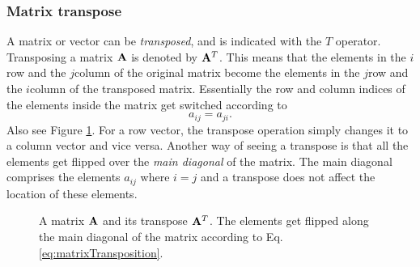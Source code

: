 \subsubsection{Matrix transpose}
A matrix or vector can be \textit{transposed}, and is indicated with the $T$ operator. Transposing a matrix $\mathbf{A}$ is denoted by $\mathbf{A}^T$. This means that the elements in the $i$\th row and the $j$\th column of the original matrix become the elements in the $j$\th row and the $i$\th column of the transposed matrix. Essentially the row and column indices of the elements inside the matrix get switched according to
\begin{equation}\label{eq:matrixTransposition}
    a_{ij} = a_{ji}.
\end{equation} 
Also see Figure \ref{fig:matrixTransp}. For a row vector, the transpose operation simply changes it to a column vector and vice versa. Another way of seeing a transpose is that all the elements get flipped over the \textit{main diagonal} of the matrix. The main diagonal comprises the elements $a_{ij}$ where $i=j$ and a transpose does not affect the location of these elements. 

\begin{figure}[h]
    \centering
    \hspace{0.03cm}
    \caption{A matrix $\mathbf{A}$ and its transpose $\mathbf{A}^T$. The elements get flipped along the main diagonal of the matrix according to Eq. \eqref{eq:matrixTransposition}. \label{fig:matrixTransp}}
\end{figure}

